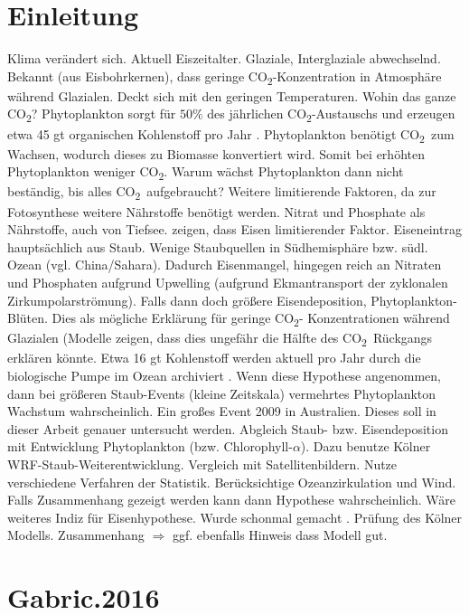 \documentclass[12pt,a4paper,onecolumn]{scrartcl}
\newcommand{\cotwo}{CO\textsubscript{2}}
\begin{document}
\section{Einleitung}
Klima verändert sich. Aktuell Eiszeitalter. Glaziale, Interglaziale abwechselnd. Bekannt (aus Eisbohrkernen), dass geringe \cotwo -Konzentration in Atmosphäre während Glazialen. Deckt sich mit den geringen Temperaturen. Wohin das ganze \cotwo ? Phytoplankton sorgt für $50\%$ des jährlichen \cotwo -Austauschs \citep{Field.1998} und erzeugen etwa 45 gt organischen Kohlenstoff pro Jahr \citep{Falkowski.1998}. Phytoplankton benötigt \cotwo \ zum Wachsen, wodurch dieses zu Biomasse konvertiert wird. Somit bei erhöhten Phytoplankton weniger \cotwo . Warum wächst Phytoplankton dann nicht beständig, bis alles \cotwo\ aufgebraucht? Weitere limitierende Faktoren, da zur Fotosynthese weitere Nährstoffe benötigt werden. Nitrat und Phosphate als Nährstoffe, auch von Tiefsee. \citet{Martin.1988} zeigen, dass Eisen limitierender Faktor. Eiseneintrag hauptsächlich aus Staub. Wenige Staubquellen in Südhemisphäre bzw. südl. Ozean (vgl. China/Sahara). Dadurch Eisenmangel, hingegen reich an Nitraten und Phosphaten aufgrund Upwelling (aufgrund Ekmantransport der zyklonalen Zirkumpolarströmung). Falls dann doch größere Eisendeposition, Phytoplankton-Blüten. Dies als mögliche Erklärung für geringe \cotwo - Konzentrationen während Glazialen (Modelle zeigen, dass dies ungefähr die Hälfte des \cotwo \ Rückgangs erklären könnte. Etwa 16 gt Kohlenstoff werden aktuell pro Jahr durch die biologische Pumpe im Ozean archiviert \citep{Falkowski.1998}. Wenn diese Hypothese angenommen, dann bei größeren Staub-Events (kleine Zeitskala) vermehrtes Phytoplankton Wachstum wahrscheinlich. Ein großes Event 2009 in Australien. Dieses soll in dieser Arbeit genauer untersucht werden. Abgleich Staub- bzw. Eisendeposition mit Entwicklung Phytoplankton (bzw. Chlorophyll-$\alpha$). Dazu benutze Kölner WRF-Staub-Weiterentwicklung. Vergleich mit Satellitenbildern. Nutze verschiedene Verfahren der Statistik. Berücksichtige Ozeanzirkulation und Wind. Falls Zusammenhang gezeigt werden kann dann Hypothese wahrscheinlich. Wäre weiteres Indiz für Eisenhypothese. Wurde schonmal gemacht \citep{Gabric.2016}. Prüfung des Kölner Modells. Zusammenhang $\Rightarrow$ ggf. ebenfalls Hinweis dass Modell gut.
\section{Gabric.2016}
\end{document}
